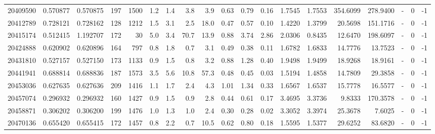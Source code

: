 \begin{tabular}{rrrrrrrrrrrrrrrrlrr}
  20409590 & 0.570877 &   0.570875 &  197 & 1500 &      1.2 &      1.4 &     3.8 &      3.9 &       0.63 &        0.79 &        0.16 &  1.7545 &  1.7553 &  354.6099 &  278.9400 &             - &        0 &         -1 \\
  20412789 & 0.728121 &   0.728162 &  128 & 1212 &      1.5 &      3.1 &     2.5 &     18.0 &       0.47 &        0.57 &        0.10 &  1.4220 &  1.3799 &   20.5698 &  151.1716 &             - &        0 &         -1 \\
  20415174 & 0.512415 &   1.192707 &  172 &   30 &      5.0 &      3.4 &    70.7 &     13.9 &       0.88 &        3.74 &        2.86 &  2.0306 &  0.8435 &   12.6470 &  198.6097 &             - &        0 &         -1 \\
  20424888 & 0.620902 &   0.620896 &  164 &  797 &      0.8 &      1.8 &     0.7 &      3.1 &       0.49 &        0.38 &        0.11 &  1.6782 &  1.6833 &   14.7776 &   13.7523 &             - &        0 &         -1 \\
  20431810 & 0.527157 &   0.527150 &  173 & 1133 &      0.9 &      1.5 &     0.8 &      3.2 &       0.88 &        1.28 &        0.40 &  1.9498 &  1.9499 &   18.9268 &   18.9161 &             - &        0 &         -1 \\
  20441941 & 0.688814 &   0.688836 &  187 & 1573 &      3.5 &      5.6 &    10.8 &     57.3 &       0.48 &        0.45 &        0.03 &  1.5194 &  1.4858 &   14.7809 &   29.3858 &             - &        0 &         -1 \\
  20453036 & 0.627635 &   0.627636 &  209 & 1416 &      1.1 &      1.7 &     2.4 &      4.3 &       1.01 &        1.34 &        0.33 &  1.6567 &  1.6537 &   15.7778 &   16.5577 &             - &        0 &         -1 \\
  20457074 & 0.296932 &   0.296932 &  160 & 1427 &      0.9 &      1.5 &     0.9 &      2.8 &       0.44 &        0.61 &        0.17 &  3.4695 &  3.3736 &    9.8333 &  170.3578 &             - &        0 &         -1 \\
  20458871 & 0.306202 &   0.306200 &  199 & 1476 &      1.0 &      1.3 &     1.0 &      2.4 &       0.30 &        0.28 &        0.02 &  3.3052 &  3.3974 &   25.3678 &    7.6025 &             - &        0 &         -1 \\
  20470136 & 0.655420 &   0.655415 &  172 & 1457 &      0.8 &      2.2 &     0.7 &     10.5 &       0.62 &        0.80 &        0.18 &  1.5595 &  1.5377 &   29.6252 &   83.6820 &             - &        0 &         -1 \\

\end{tabular}
